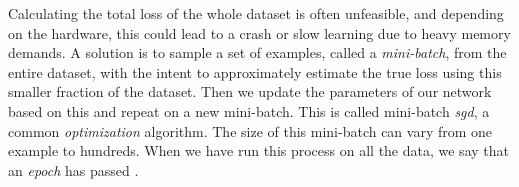     Calculating the total loss of the whole dataset is often unfeasible, and depending on the hardware, this could lead to a crash or slow learning due to
    heavy memory demands. A solution is to sample a set of examples, called a \textit{mini-batch}, from the entire dataset, with the intent to approximately estimate
    the true loss using this smaller fraction of the dataset. Then we update the parameters of our network based on this and repeat on a new mini-batch. This is called mini-batch \textit{\gls{sgd}}, a common \textit{optimization} algorithm. The size of this mini-batch can vary from one example to hundreds. When we have run this process on all the data, we say that an \textit{epoch} has passed \cite{Goodfellow-et-al-2016}.
    
    
    
    
    
    
    
